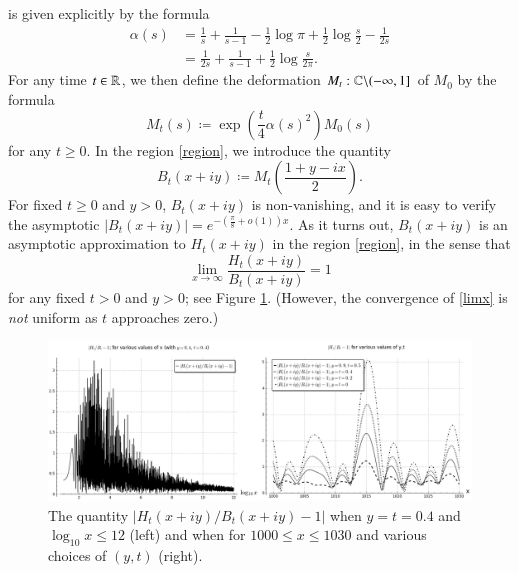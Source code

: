 is given explicitly by the formula
\begin{equation}\label{alpha-form}
\begin{split}
 \alpha(s) &= \frac{1}{s} + \frac{1}{s-1} - \frac{1}{2} \log \pi + \frac{1}{2} \log \frac{s}{2} - \frac{1}{2s} \\
&= \frac{1}{2s} + \frac{1}{s-1} + \frac{1}{2} \log \frac{s}{2\pi}.
\end{split}
\end{equation}
For any time $t \in \mathbb{R}$, we then define the deformation $M_t: \mathbb{C} \backslash (-\infty,1]$ of $M_0$ by the formula
\begin{equation}\label{Mt-def}
M_t(s) \coloneqq \exp\left( \frac{t}{4} \alpha(s)^2 \right) M_0(s)
\end{equation}
for any $t \geq 0$.
In the region \eqref{region}, we introduce the quantity
\begin{equation}\label{bo-def} 
B_t(x+iy) \coloneqq M_t\left(\frac{1+y-ix}{2}\right).
\end{equation} 
For fixed $t \geq 0$ and $y>0$, $B_t(x+iy)$ is non-vanishing, and it is easy to verify the asymptotic $|B_t(x+iy)| = e^{-(\frac{\pi}{8} + o(1)) x}$.  As it turns out, $B_t(x+iy)$ is an asymptotic approximation to $H_t(x+iy)$ in the region \eqref{region}, in the sense that
\begin{equation}\label{limx}
 \lim_{x \to \infty} \frac{H_t(x+iy)}{B_t(x+iy)} = 1
\end{equation}
for any fixed $t>0$ and $y>0$; see Figure \ref{ht-bt}.  (However, the convergence of \eqref{limx} is \emph{not} uniform as $t$ approaches zero.)

\begin{figure}[h!]
  \includegraphics[width=1.0\linewidth]{ftvsht.png}
  \caption{The quantity $|H_t(x+iy)/B_t(x+iy) - 1|$ when $y=t=0.4$ and $\log_{10} x \leq 12$ (left) and when for $1000 \leq x \leq 1030$ and various choices of $(y,t)$ (right).}
\label{ht-bt}
\end{figure}

